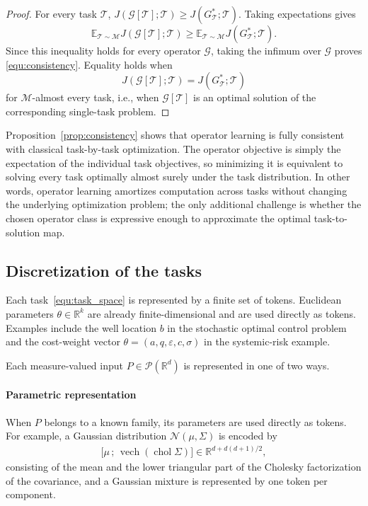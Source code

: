 \documentclass[preprint]{elsarticle}
\newcommand{\R}{\mathbb{R}}
\newcommand{\E}{\mathbb{E}}
\newcommand{\pr}{\mathscr{P}}           %
\newcommand{\sM}{\mathcal{M}}
\newcommand{\sT}{\mathcal{T}}
\newcommand{\sG}{\mathcal{G}}
\begin{document}
\begin{proof}
For every task $\sT$, $J(\sG[\sT];\sT) \ge J(G_\sT^*;\sT)$. Taking expectations gives
\[
\E_{\sT\sim\sM}J(\sG[\sT];\sT)
\ge
\E_{\sT\sim\sM}J(G_\sT^*;\sT).
\]
Since this inequality holds for every operator $\sG$, taking the infimum over $\sG$ proves
\eqref{equ:consistency}. Equality holds when
\[
J(\sG[\sT];\sT)=J(G_\sT^*;\sT)
\]
for $\sM$-almost every task, i.e., when $\sG[\sT]$ is an optimal solution of the corresponding single-task problem.
\end{proof}

Proposition~\ref{prop:consistency} shows that operator learning is fully consistent with classical task-by-task optimization. The operator objective is simply the expectation of the individual task objectives, so minimizing it is equivalent to solving every task optimally almost surely under the task distribution. In other words, operator learning amortizes computation across tasks without changing the underlying optimization problem; the only additional challenge is whether the chosen operator class is expressive enough to approximate the optimal task-to-solution map.

\subsection{Discretization of the tasks}\label{sec:task_disc}

Each task~\eqref{equ:task_space} is represented by a finite set of tokens. Euclidean parameters $\theta\in\R^k$ are already finite-dimensional and are used directly as tokens. Examples include the well location $b$ in the stochastic optimal control problem and the cost-weight vector $\theta=(a,q,\varepsilon,c,\sigma)$ in the systemic-risk example. 

Each measure-valued input $P\in\pr(\R^d)$ is represented in one of two ways.

\paragraph{Parametric representation} 
When $P$ belongs to a known family, its parameters are used directly as tokens. For example, a Gaussian distribution $\mathcal N(\mu,\Sigma)$ is encoded by
\begin{align}
    \bigl[\mu\,;\,\operatorname{vech}(\operatorname{chol}\Sigma)\bigr]
    \in
    \R^{d+d(d+1)/2},
    \label{equ:gauss_token}
\end{align}
consisting of the mean and the lower triangular part of the Cholesky factorization of the covariance, and a Gaussian mixture is represented by one token per component.
\end{document}
